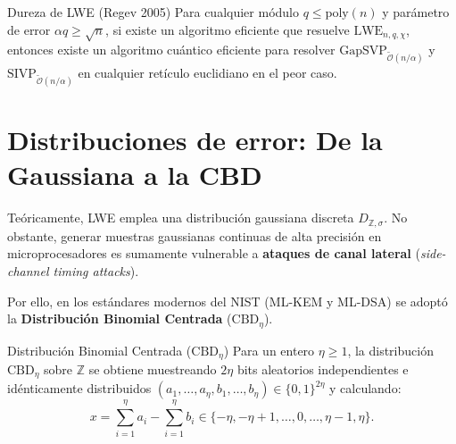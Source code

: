 \documentclass[11pt,a4paper,twoside,openright]{book}
\theoremstyle{plain}
\theoremstyle{definition}
\theoremstyle{remark}
\newcommand{\Z}{\mathbb{Z}}
\newcommand{\MLKEM}{\textsf{ML-KEM}}
\newcommand{\MLDSA}{\textsf{ML-DSA}}
\newcommand{\CBD}{\mathrm{CBD}}
\begin{document}
\begin{miteo}{Dureza de LWE (Regev 2005)}
Para cualquier m\'odulo $q \leq \mathrm{poly}(n)$ y par\'ametro de error $\alpha q \geq \sqrt{n}$, si existe un algoritmo eficiente que resuelve $\mathrm{LWE}_{n, q, \chi}$, entonces existe un algoritmo cu\'antico eficiente para resolver $\mathrm{GapSVP}_{\widetilde{\mathcal{O}}(n/\alpha)}$ y $\mathrm{SIVP}_{\widetilde{\mathcal{O}}(n/\alpha)}$ en cualquier ret\'iculo euclidiano en el peor caso.
\end{miteo}

\section{Distribuciones de error: De la Gaussiana a la CBD}

Te\'oricamente, LWE emplea una distribuci\'on gaussiana discreta $D_{\Z, \sigma}$. No obstante, generar muestras gaussianas continuas de alta precisi\'on en microprocesadores es sumamente vulnerable a \textbf{ataques de canal lateral} (\emph{side-channel timing attacks}).

Por ello, en los est\'andares modernos del NIST (\MLKEM{} y \MLDSA{}) se adopt\'o la \textbf{Distribuci\'on Binomial Centrada} ($\CBD_\eta$).

\begin{midef}{Distribuci\'on Binomial Centrada ($\CBD_\eta$)}
Para un entero $\eta \geq 1$, la distribuci\'on $\CBD_\eta$ sobre $\Z$ se obtiene muestreando $2\eta$ bits aleatorios independientes e id\'enticamente distribuidos $(a_1, \ldots, a_\eta, b_1, \ldots, b_\eta) \in \{0, 1\}^{2\eta}$ y calculando:
\[
  x = \sum_{i=1}^\eta a_i - \sum_{i=1}^\eta b_i \in \{-\eta, -\eta+1, \ldots, 0, \ldots, \eta-1, \eta\}.
\]
\end{midef}
\end{document}
